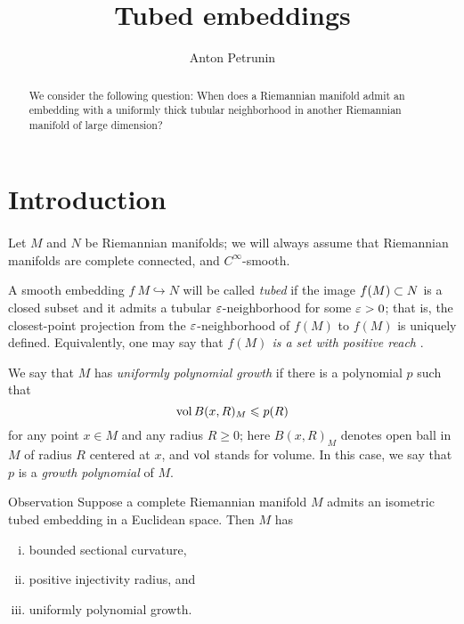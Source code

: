 \documentclass[a4paper,10pt]{article}
\def\thetitle{Tubed embeddings}
\def\theauthors{Anton Petrunin}
\begin{document}


\title{\thetitle}
\author{\theauthors}
\date{}
\maketitle

\begin{abstract}
We consider the following question:
When does a Riemannian manifold admit an embedding with a uniformly thick tubular neighborhood in another Riemannian manifold of large dimension?
\end{abstract}

\section*{Introduction}

\paragraph{}\label{par:Observation}
Let $M$ and $N$ be Riemannian manifolds; we will always assume that Riemannian manifolds are complete connected, and $C^\infty$-smooth.

A smooth embedding $f\:M\hookrightarrow N$ will be called \emph{tubed} if the image $f(M)\z\subset N$ is a closed subset and it admits a tubular $\varepsilon$-neighborhood for some $\varepsilon>0$;
that is, the closest-point projection from the $\varepsilon$-neighborhood of $f(M)$ to $f(M)$ is uniquely defined.
Equivalently, one may say that \textit{$f(M)$ is a set with positive reach} \cite{federer,bangert}.

We say that $M$ has \emph{uniformly polynomial growth} if there is a polynomial $p$ such that 
\[\operatorname{\rm vol} B(x,R)_M\leqslant p(R)\]
for any point $x\in M$ and any radius $R\ge 0$;
here $B(x,R)_M$ denotes open ball in $M$ of radius $R$ centered at $x$, and $\operatorname{\rm vol}$ stands for volume.
In this case, we say that $p$ is a \emph{growth polynomial} of $M$.

\begin{thm}{Observation}
Suppose a complete Riemannian manifold $M$ admits an isometric tubed embedding in a Euclidean space.
Then $M$ has
\begin{enumerate}[(i)]
\item bounded sectional curvature,
\item positive injectivity radius, and
\item\label{uniformly polynomial growth} uniformly  polynomial growth.
\end{enumerate}
\end{thm}
\end{document}
